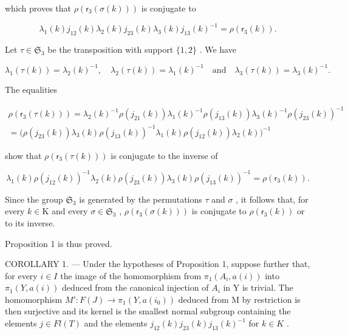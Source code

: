 which proves that \(\rho(\mathsf{r}_3(\sigma(k)))\) is conjugate to

\[
\lambda_ {1} (k) j _ {1 2} (k) \lambda_ {2} (k) j _ {2 3} (k) \lambda_ {3} (k) j _ {1 3} (k) ^ {- 1} = \rho (\mathsf {r} _ {3} (k)).
\]

Let \(\tau \in \mathfrak{S}_3\) be the transposition with support \(\{1,2\}\) . We have

\[
\lambda_ {1} (\tau (k)) = \lambda_ {2} (k) ^ {- 1}, \quad \lambda_ {2} (\tau (k)) = \lambda_ {1} (k) ^ {- 1} \quad \text {and} \quad \lambda_ {3} (\tau (k)) = \lambda_ {3} (k) ^ {- 1}.
\]

The equalities

\[
\begin{array}{c} \rho (\mathsf {r} _ {3} (\tau (k))) = \lambda_ {2} (k) ^ {- 1} \rho (j _ {2 1} (k)) \lambda_ {1} (k) ^ {- 1} \rho (j _ {1 3} (k)) \lambda_ {3} (k) ^ {- 1} \rho (j _ {2 3} (k)) ^ {- 1} \\ = \big (\rho (j _ {2 3} (k)) \lambda_ {3} (k) \rho (j _ {1 3} (k)) ^ {- 1} \lambda_ {1} (k) \rho (j _ {1 2} (k)) \lambda_ {2} (k) \big) ^ {- 1} \end{array}
\]

show that \(\rho(\mathsf{r}_3(\tau(k)))\) is conjugate to the inverse of

\[
\lambda_ {1} (k) \rho (j _ {1 2} (k)) ^ {- 1} \lambda_ {2} (k) \rho (j _ {2 3} (k)) \lambda_ {3} (k) \rho (j _ {1 3} (k)) ^ {- 1} = \rho (\mathsf {r} _ {3} (k)).
\]

Since the group \(\mathfrak{S}_3\) is generated by the permutations \(\tau\) and \(\sigma\) , it follows that, for every \(k \in \mathrm{K}\) and every \(\sigma \in \mathfrak{S}_3\) , \(\rho(\mathsf{r}_3(\sigma(k)))\) is conjugate to \(\rho(\mathsf{r}_3(k))\) or to its inverse.

Proposition 1 is thus proved.

COROLLARY 1. --- Under the hypotheses of Proposition 1, suppose further that, for every \(i \in I\) the image of the homomorphism from \(\pi_1(A_i, a(i))\) into \(\pi_1(Y, a(i))\) deduced from the canonical injection of \(A_i\) in Y is trivial. The homomorphism \(M': F(J) \to \pi_1(Y, a(i_0))\) deduced from M by restriction is then surjective and its kernel is the smallest normal subgroup containing the elements \(j \in Fl(T)\) and the elements \(j_{12}(k) j_{23}(k) j_{13}(k)^{-1}\) for \(k \in K\) .

